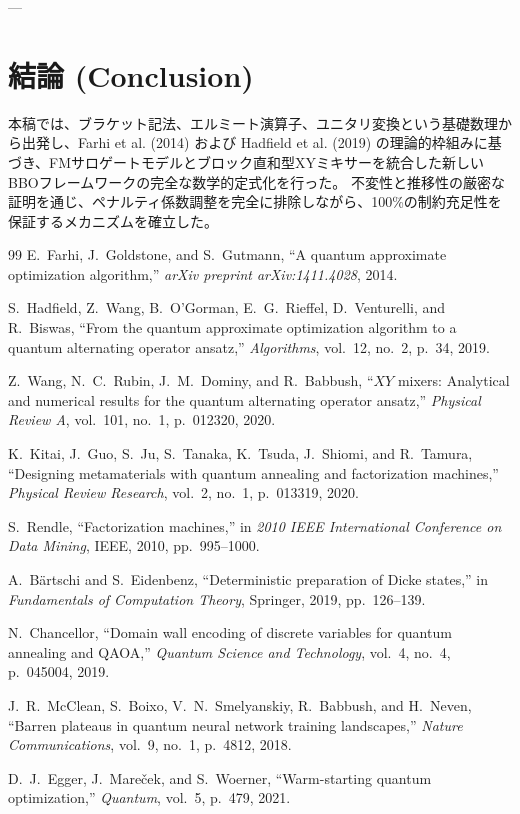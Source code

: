 \documentclass[11pt,a4paper]{ltjsarticle}
\theoremstyle{definition}
\theoremstyle{plain}
\theoremstyle{remark}
\begin{document}
---

\section{結論 (Conclusion)}
本稿では、ブラケット記法、エルミート演算子、ユニタリ変換という基礎数理から出発し、Farhi et al. (2014) および Hadfield et al. (2019) の理論的枠組みに基づき、FMサロゲートモデルとブロック直和型XYミキサーを統合した新しいBBOフレームワークの完全な数学的定式化を行った。
不変性と推移性の厳密な証明を通じ、ペナルティ係数調整を完全に排除しながら、100\%の制約充足性を保証するメカニズムを確立した。

\begin{thebibliography}{99}
E.~Farhi, J.~Goldstone, and S.~Gutmann, 
``A quantum approximate optimization algorithm,'' 
\textit{arXiv preprint arXiv:1411.4028}, 2014.

S.~Hadfield, Z.~Wang, B.~O'Gorman, E.~G.~Rieffel, D.~Venturelli, and R.~Biswas, 
``From the quantum approximate optimization algorithm to a quantum alternating operator ansatz,'' 
\textit{Algorithms}, vol.~12, no.~2, p.~34, 2019.

Z.~Wang, N.~C.~Rubin, J.~M.~Dominy, and R.~Babbush, 
``$XY$ mixers: Analytical and numerical results for the quantum alternating operator ansatz,'' 
\textit{Physical Review A}, vol.~101, no.~1, p.~012320, 2020.

K.~Kitai, J.~Guo, S.~Ju, S.~Tanaka, K.~Tsuda, J.~Shiomi, and R.~Tamura, 
``Designing metamaterials with quantum annealing and factorization machines,'' 
\textit{Physical Review Research}, vol.~2, no.~1, p.~013319, 2020.

S.~Rendle, 
``Factorization machines,'' 
in \textit{2010 IEEE International Conference on Data Mining}, IEEE, 2010, pp.~995--1000.

A.~B{\"a}rtschi and S.~Eidenbenz, 
``Deterministic preparation of Dicke states,'' 
in \textit{Fundamentals of Computation Theory}, Springer, 2019, pp.~126--139.

N.~Chancellor, 
``Domain wall encoding of discrete variables for quantum annealing and QAOA,'' 
\textit{Quantum Science and Technology}, vol.~4, no.~4, p.~045004, 2019.

J.~R.~McClean, S.~Boixo, V.~N.~Smelyanskiy, R.~Babbush, and H.~Neven, 
``Barren plateaus in quantum neural network training landscapes,'' 
\textit{Nature Communications}, vol.~9, no.~1, p.~4812, 2018.

D.~J.~Egger, J.~Mare{\v{c}}ek, and S.~Woerner, 
``Warm-starting quantum optimization,'' 
\textit{Quantum}, vol.~5, p.~479, 2021.
\end{thebibliography}
\end{document}
